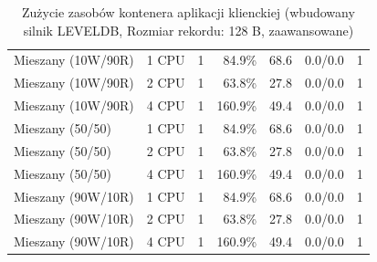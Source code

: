 \begin{table}[ht]
{\begin{tabular}{llcrrcc}
Mieszany (10W/90R) & 1 CPU & 1 & 84.9\% & 68.6 & 0.0/0.0 & 1 \\
Mieszany (10W/90R) & 2 CPU & 1 & 63.8\% & 27.8 & 0.0/0.0 & 1 \\
Mieszany (10W/90R) & 4 CPU & 1 & 160.9\% & 49.4 & 0.0/0.0 & 1 \\
Mieszany (50/50) & 1 CPU & 1 & 84.9\% & 68.6 & 0.0/0.0 & 1 \\
Mieszany (50/50) & 2 CPU & 1 & 63.8\% & 27.8 & 0.0/0.0 & 1 \\
Mieszany (50/50) & 4 CPU & 1 & 160.9\% & 49.4 & 0.0/0.0 & 1 \\
Mieszany (90W/10R) & 1 CPU & 1 & 84.9\% & 68.6 & 0.0/0.0 & 1 \\
Mieszany (90W/10R) & 2 CPU & 1 & 63.8\% & 27.8 & 0.0/0.0 & 1 \\
Mieszany (90W/10R) & 4 CPU & 1 & 160.9\% & 49.4 & 0.0/0.0 & 1 \\
\bottomrule
\end{tabular}%
}
\caption{Zużycie zasobów kontenera aplikacji klienckiej (wbudowany silnik LEVELDB, Rozmiar rekordu: 128 B, zaawansowane)}
\label{tab:resources_leveldb_small_0}
\end{table}
